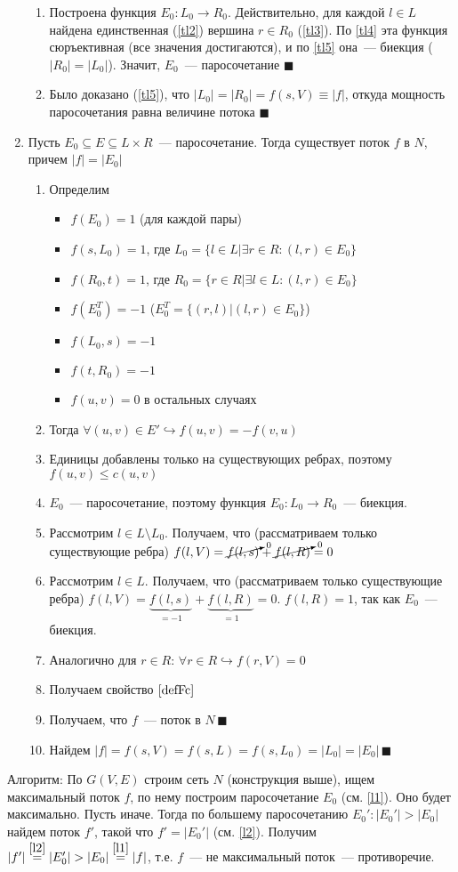 \documentclass[a4paper]{article}
\begin{document}
\begin{enumerate}
\begin{enumerate}
\item Построена функция $E_0\colon L_0\to R_0$. Действительно, для каждой $l\in L$ найдена единственная (\ref{tl2}) вершина $r\in R_0$ (\ref{tl3}). По \ref{tl4} эта функция сюръективная (все значения достигаются), и по \ref{tl5} она~--- биекция ($|R_0|=|L_0|$). Значит, $E_0$~--- паросочетание $\blacksquare$
\item Было доказано (\ref{tl5}), что $|L_0|=|R_0|=f(s,V)\equiv |f|$, откуда мощность паросочетания равна величине потока $\blacksquare$
\end{enumerate}
\item \label{l2} Пусть $E_0\subseteq E\subseteq L\times R$~--- паросочетание. Тогда существует поток $f$ в $N$, причем $|f|=|E_0|$\begin{enumerate}
\item Определим\begin{itemize}
\item $f(E_0)=1$ (для каждой пары)
\item $f(s,L_0)=1$, где $L_0=\{l\in L\big|\exists r\in R\colon (l,r)\in E_0\}$
\item $f(R_0,t)=1$, где $R_0=\{r\in R\big|\exists l\in L\colon (l,r)\in E_0\}$
\item $f(E_0^T)=-1$ ($E_0^T=\{(r,l)\big|(l,r)\in E_0\}$)
\item $f(L_0,s)=-1$
\item $f(t,R_0)=-1$
\item $f(u,v)=0$ в остальных случаях
\end{itemize}
\item Тогда $\forall (u,v)\in E'\hookrightarrow f(u,v)=-f(v,u)$
\item Единицы добавлены только на существующих ребрах, поэтому $f(u,v)\leqslant c(u,v)$
\item $E_0$~--- паросочетание, поэтому функция $E_0\colon L_0\to R_0$~--- биекция.
\item Рассмотрим $l\in L\setminus L_0$. Получаем, что (рассматриваем только существующие ребра) $f(l,V)=\cancelto{0}{f(l,s)}+\cancelto{0}{f(l,R)}=0$
\item Рассмотрим $l\in L$. Получаем, что (рассматриваем только существующие ребра) $f(l,V)=\underbrace{f(l,s)}_{=-1}+\underbrace{f(l,R)}_{=1}=0$. $f(l,R)=1$, так как $E_0$~--- биекция.
\item Аналогично для $r\in R$: $\forall r\in R\hookrightarrow f(r,V)=0$
\item Получаем свойство $\ref{defFc}$
\item Получаем, что $f$~--- поток в $N\,\blacksquare$
\item Найдем $|f|=f(s,V)=f(s,L)=f(s,L_0)=|L_0|=|E_0|\,\blacksquare$
\end{enumerate}
\end{enumerate}
Алгоритм: По $G(V,E)$ строим сеть $N$ (конструкция выше), ищем максимальный поток $f$, по нему построим паросочетание $E_0$ (см. \ref{l1}).\newline
Оно будет максимально. Пусть иначе. Тогда по большему паросочетанию $E_0'\colon |E_0'|>|E_0|$ найдем поток $f'$, такой что $f'=|E_0'|$ (см. \ref{l2}). Получим $|f'|\overset{\ref{l2}}{=}|E_0'|>|E_0|\overset{\ref{l1}}{=}|f|$, т.е. $f$~--- не максимальный поток~--- противоречие.
\end{document}
